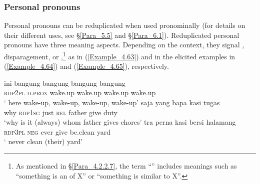{\subsubsection[Personal pronouns]{Personal pronouns}
\label{Para_4.2.5.1}
Personal pronouns can be reduplicated when used pronominally (for details on their different uses, see §\ref{Para_5.5} and §\ref{Para_6.1}). Reduplicated personal pronouns have three meaning aspects. Depending on the context, they signal , disparagement, or ,\footnote{As mentioned in §\ref{Para_4.2.2.7}, the term ``'' includes meanings such as ``something is an  of X'' or ``something is similar to X''.} as in (\ref{Example_4.63}) and in the elicited examples in (\ref{Example_4.64}) and (\ref{Example_4.65}), respectively.


\ea
\label{Example_4.63}
 {ini} {bangung} {bangung} {bangung} {bangung}\\ %
 \textsc{rdp}{\Tilde}\textsc{2pl}  \textsc{d.prox}  wake.up  wake.up  wake.up  wake.up\\
\glt 
‘ here wake-up, wake-up, wake-up, wake-up’ \textstyleExampleSource{[081115-001a-Cv.0329]}
\z
\ea
\label{Example_4.64}
 {} {saja} {yang} {bapa} {kasi} {tugas}\\ %
 why  \textsc{rdp}{\Tilde}\textsc{1sg}  just  \textsc{rel}  father  give  duty\\
\glt 
‘why is it (always)  whom father gives chores’ \textstyleExampleSource{[Elicited BR120813.025]}
\z
\ea
\label{Example_4.65}
 {tra} {perna} {kasi} {bersi} {halamang}\\ %
 \textsc{rdp}{\Tilde}\textsc{3pl}  \textsc{neg}  ever  give  be.clean  yard\\
\glt
‘ never clean (their) yard’ \textstyleExampleSource{[Elicited BR120813.024]}
\z


}
